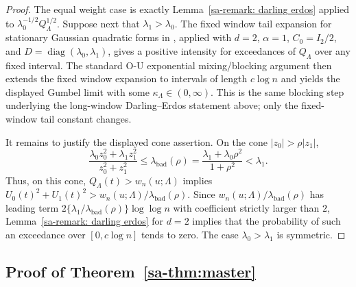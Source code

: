 \documentclass[10pt]{article}
\theoremstyle{definition}
\theoremstyle{remark}
\begin{document}
\begin{proof}
The equal weight case is exactly Lemma~\ref{sa-remark: darling erdos} applied
to $\lambda_0^{-1/2}Q_\Lambda^{1/2}$. Suppose next that
$\lambda_1>\lambda_0$. The fixed window tail expansion for stationary Gaussian
quadratic forms in \citet[Theorem~1]{zhdanov2022high}, applied with
$d=2$, $\alpha=1$, $C_0=I_2/2$, and
$D=\operatorname{diag}(\lambda_0,\lambda_1)$, gives a positive intensity for
exceedances of $Q_\Lambda$ over any fixed interval. The standard O-U
exponential mixing/blocking argument then extends the fixed window expansion
to intervals of length $c\log n$ and yields the displayed Gumbel limit with
some $\kappa_\Lambda\in(0,\infty)$. This is the same blocking step underlying
the long-window Darling--Erdos statement above; only the fixed-window tail
constant changes.

It remains to justify the displayed cone assertion. On the cone
$|z_0|>\rho |z_1|$,
\[
    \frac{\lambda_0z_0^2+\lambda_1z_1^2}{z_0^2+z_1^2}
    \leq
    \lambda_{\mathrm{bad}}(\rho)
    =
    \frac{\lambda_1+\lambda_0\rho^2}{1+\rho^2}
    <
    \lambda_1 .
\]
Thus, on this cone, $Q_\Lambda(t)>w_n(u;\Lambda)$ implies
$U_0(t)^2+U_1(t)^2>w_n(u;\Lambda)/\lambda_{\mathrm{bad}}(\rho)$.
Since $w_n(u;\Lambda)/\lambda_{\mathrm{bad}}(\rho)$ has leading term
$2\{\lambda_1/\lambda_{\mathrm{bad}}(\rho)\}\log\log n$ with coefficient
strictly larger than $2$, Lemma~\ref{sa-remark: darling erdos} for $d=2$
implies that the probability of such an exceedance over $[0,c\log n]$ tends
to zero. The case $\lambda_0>\lambda_1$ is symmetric.
\end{proof}

\subsection{Proof of Theorem~\ref{sa-thm:master}}
\end{document}
